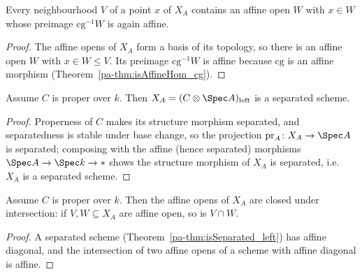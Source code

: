 \begin{theorem}
  \label{pa-thm:exists_isAffineOpen_cg_le}
  \leanok

  Every neighbourhood \(V\) of a point \(x\) of \(X_A\) contains an affine open \(W\) with \(x \in
  W\) whose preimage \(\mathrm{cg}^{-1}W\) is again affine.
\end{theorem}
\begin{proof}
  \leanok
  The affine opens of \(X_A\) form a basis of its topology, so there is an affine open \(W\) with
  \(x \in W \le V\). Its preimage \(\mathrm{cg}^{-1}W\) is affine because \(\mathrm{cg}\) is an
  affine morphism (Theorem~\ref{pa-thm:isAffineHom_cg}).
\end{proof}

\begin{theorem}
  \label{pa-thm:isSeparated_left}
  \leanok

  Assume \(C\) is proper over \(k\). Then \(X_A = (C \otimes \Spec A)_{\mathrm{left}}\) is a
  separated scheme.
\end{theorem}
\begin{proof}
  \leanok
  Properness of \(C\) makes its structure morphism separated, and separatedness is stable under
  base change, so the projection \(\mathrm{pr}_A \colon X_A \to \Spec A\) is separated; composing
  with the affine (hence separated) morphisms \(\Spec A \to \Spec k \to \ast\) shows the structure
  morphism of \(X_A\) is separated, i.e.\ \(X_A\) is a separated scheme.
\end{proof}

\begin{theorem}
  \label{pa-thm:isAffineOpen_inf}
  \leanok

  Assume \(C\) is proper over \(k\). Then the affine opens of \(X_A\) are closed under
  intersection: if \(V, W \subseteq X_A\) are affine open, so is \(V \cap W\).
\end{theorem}
\begin{proof}
  \leanok
  A separated scheme (Theorem~\ref{pa-thm:isSeparated_left}) has affine diagonal, and the
  intersection of two affine opens of a scheme with affine diagonal is affine.
\end{proof}

